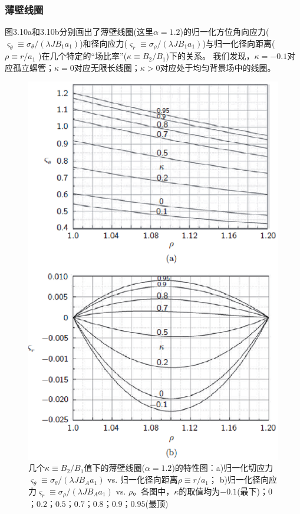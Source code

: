 \subsubsection{薄壁线圈}
图3.10a和3.10b分别画出了薄壁线圈(这里$\alpha=1.2$)的归一化方位角向应力($\varsigma_\theta\equiv \sigma_{\theta}/(\lambda J B_1 a_1)$)和径向应力($\varsigma_r\equiv \sigma_{\rho}/(\lambda J B_1 a_1)$)与归一化径向距离($\rho\equiv r/a_1$ )在几个特定的“场比率”($\kappa\equiv B_2/B_1$)下的关系。
我们发现，$\kappa=-0.1$对应孤立螺管；$\kappa=0$对应无限长线圈；$\kappa>0$对应处于均匀背景场中的线圈。
\begin{figure}
  \centering
 \includegraphics[scale=0.8]{chpt3/figs/fig3.10.eps}
  \caption{几个$\kappa\equiv B_2/B_1$值下的薄壁线圈($\alpha=1.2$)的特性图：a)归一化切应力$\varsigma_\theta\equiv \sigma_\theta/(\lambda J B_A a_1)$ vs. 归一化径向距离$\rho\equiv r/a_1$；
  b)归一化径向应力$\varsigma_r \equiv \sigma_\rho/(\lambda J B_A a_1)$ vs.  $\rho$。各图中，$\kappa$的取值均为$-0.1$(最下)；$0$；$0.2$；$0.5$；$0.7$；$0.8$；$0.9$；$0.95$(最顶) }
\end{figure}

